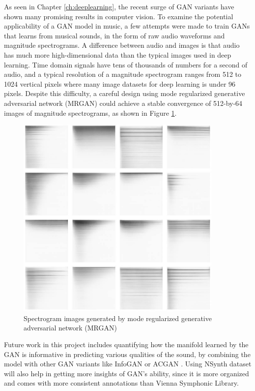 As seen in Chapter \ref{ch:deeplearning}, the recent surge of GAN variants have shown many promising results in computer vision.
To examine the potential applicability of a GAN model in music, a few attempts were made to train GANs that learns from musical sounds, in the form of raw audio waveforms and magnitude spectrograms.
A difference between audio and images is that audio has much more high-dimensional data than the typical images used in deep learning.
Time domain signals have tens of thousands of numbers for a second of audio, and a typical resolution of a magnitude spectrogram ranges from 512 to 1024 vertical pixels where many image datasets for deep learning is under 96 pixels.
Despite this difficulty, a careful design using mode regularized generative adversarial network (MRGAN) \cite{che2016mrgan} could achieve a stable convergence of 512-by-64 images of magnitude spectrograms, as shown in Figure \ref{fig:gan}.

\begin{figure}
	\centering
	\includegraphics[width=0.9\textwidth]{gan.jpg}
	\caption{Spectrogram images generated by mode regularized generative adversarial network (MRGAN) %
	}\label{fig:gan}
\end{figure}

Future work in this project includes quantifying how the manifold learned by the GAN is informative in predicting various qualities of the sound, by combining the model with other GAN variants like InfoGAN \cite{chen2016infogan} or ACGAN \cite{odena2016acgan}.
Using NSynth dataset will also help in getting more insights of GAN's ability, since it is more organized and comes with more consistent annotations than Vienna Symphonic Library.


